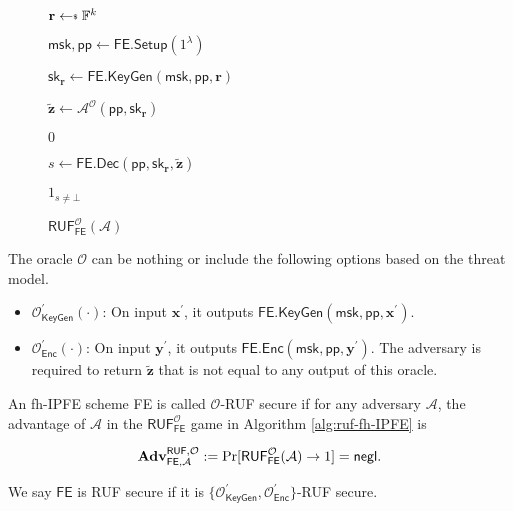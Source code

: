 \begin{figure}[H]
\centering

	\begin{minipage}[t]{0.55\textwidth}
	\begin{algorithm}[H]
	\caption{$\textsf{RUF}^{\mathcal{O}}_{\textsf{FE}}(\mathcal{A})$}
	\label{alg:ruf-fh-IPFE}
	\begin{algorithmic}[1]
		\State $\mathbf{r} \getsdollar \mathbb{F}^{k}$ \label{alg:oracle-ruf-fh-IPFE:r}

		\State $\textsf{msk}, \textsf{pp} \gets \textsf{FE.Setup}(1^\lambda)$

		\State $\textsf{sk}_{\mathbf{r}} \gets \textsf{FE.KeyGen}(\textsf{msk}, \textsf{pp}, \mathbf{r})$

		\State $\mathbf{\tilde{z}} \gets \mathcal{A}^{\mathcal{O}} ( \textsf{pp}, \textsf{sk}_{\mathbf{r}} )$

			
			\State \Return $0$
		
		\EndIf

		\State $s \gets \textsf{FE.Dec}(\textsf{pp}, \textsf{sk}_{\mathbf{r}}, \mathbf{\tilde{z}} )$

		\State \Return $1_{s \neq \bot}$
	\end{algorithmic}
	\end{algorithm}
	\end{minipage}

\end{figure}

The oracle $\mathcal{O}$ can be nothing or include the following options based on the threat model.

\begin{itemize}

	\item $\mathcal{O}^\prime_{\textsf{KeyGen}}(\cdot)$: On input $\mathbf{x}^\prime$, it outputs $\textsf{FE.KeyGen}(\textsf{msk}, \textsf{pp}, \mathbf{x}^\prime)$.
	
	\item $\mathcal{O}^\prime_{\textsf{Enc}}(\cdot)$: On input $\mathbf{y}^\prime$, it outputs $\textsf{FE.Enc}(\textsf{msk}, \textsf{pp}, \mathbf{y}^\prime)$. The adversary is required to return $\mathbf{\tilde{z}}$ that is not equal to any output of this oracle.
\end{itemize}

\begin{definition}

	An fh-IPFE scheme \textsf{FE} is called $\mathcal{O}$-RUF secure if for any adversary $\mathcal{A}$, the advantage of $\mathcal{A}$ in the $\textsf{RUF}^{\mathcal{O}}_\textsf{FE}$ game in Algorithm \ref{alg:ruf-fh-IPFE} is

\[
	\mathbf{Adv}_{\textsf{FE}, \mathcal{A}}^{\textsf{RUF}, \mathcal{O}} := \Pr[\textsf{RUF}^{\mathcal{O}}_{\textsf{FE}}(\mathcal{A}) \to 1 ] = \mathsf{negl}.
\]

\noindent We say $\textsf{FE}$ is RUF secure if it is $\{ \mathcal{O}^\prime_{\textsf{KeyGen}}, \mathcal{O}^\prime_{\textsf{Enc}} \}$-RUF secure.

\end{definition}

